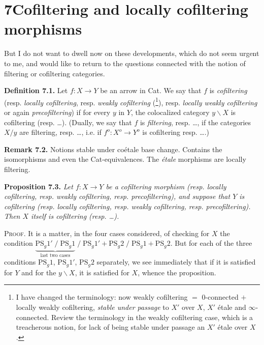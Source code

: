 \documentclass[11pt]{article}
\newcommand{\printedpage}[1]{\marginpar{\footnotesize p.~#1}}
\newcommand{\msp}[1]{\marginpar{\footnotesize [#1]}}
\begin{document}
\printedpage{56}
\msp{page 90}

\section*{7\quad Cofiltering and locally cofiltering morphisms}

But I do not want to dwell now on these developments, which do not seem urgent to me, and would like to return to the questions connected with the notion of filtering or cofiltering categories.

\textbf{Definition 7.1.} Let $f : X \longrightarrow Y$ be an arrow in Cat. We say that $f$ is \textit{cofiltering} (resp. \textit{locally cofiltering}, resp. \textit{weakly cofiltering} (\footnote[64]{I have changed the terminology: now weakly cofiltering $=$ 0-connected $+$ locally weakly cofiltering, \textit{stable under passage} to $X'$ over $X$, $X'$ étale and $\infty$-connected. Review the terminology in the weakly cofiltering case, which is a treacherous notion, for lack of being stable under passage an $X'$ étale over $X$.}), resp. \textit{locally weakly cofiltering} or again \textit{precofiltering}) if for every $y$ in $Y$, the colocalized category $y\backslash X$ is cofiltering (resp. \dots). (Dually, we say that $f$ is \textit{filtering}, resp. \dots, if the categories $X/y$ are filtering, resp. \dots, i.e. if $f^o : X^o \longrightarrow Y^o$ is cofiltering resp. \dots.) %

\textbf{Remark 7.2.} Notions stable under coétale base change. Contains the isomorphisms and even the Cat-equivalences. The \textit{étale} morphisms are locally filtering.

\textbf{Proposition 7.3.} \textit{Let $f : X \longrightarrow Y$ be a cofiltering morphism (resp. locally cofiltering, resp. weakly cofiltering, resp. precofiltering), and suppose that $Y$ is cofiltering (resp. locally cofiltering, resp. weakly cofiltering, resp. precofiltering). Then $X$ itself is cofiltering (resp. \dots).}

\textsc{Proof}. It is a matter, in the four cases considered, of checking for $X$ the condition $\underbrace{\mathrm{PS}_g1' \;/\; \mathrm{PS}_g1}_{\text{last two cases}} \;/\; \mathrm{PS}_g1' + \mathrm{PS}_g2 \;/\; \mathrm{PS}_g1 + \mathrm{PS}_g2$. But \msp{page 91} for each of the three conditions $\mathrm{PS}_g1$, $\mathrm{PS}_g1'$, $\mathrm{PS}_g2$ separately, we see immediately that if it is satisfied for $Y$ and for the $y\backslash X$, it is satisfied for $X$, whence the proposition.
\end{document}

